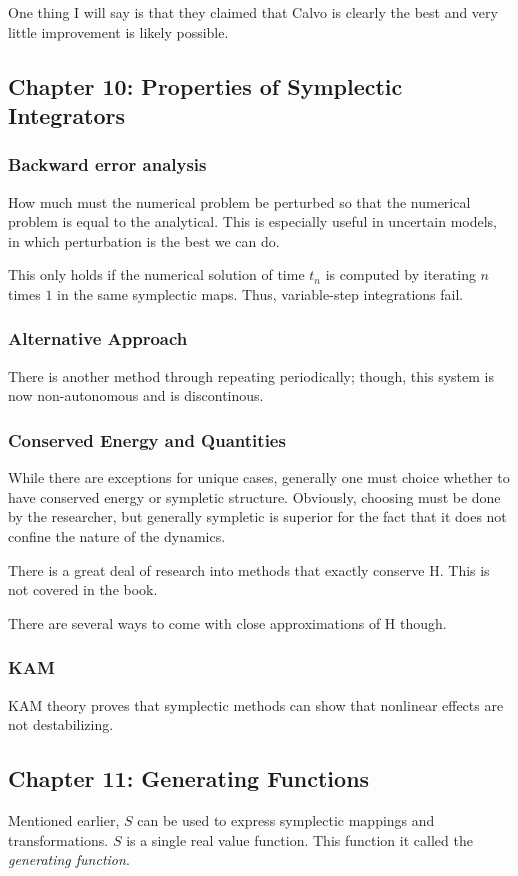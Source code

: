 One thing I will say is that they claimed that Calvo is clearly the best and very little improvement is likely possible.

\subsection{Chapter 10: Properties of Symplectic Integrators}
\subsubsection{Backward error analysis}
How much must the numerical problem be perturbed so that the numerical problem is equal to the analytical.
This is especially useful in uncertain models, in which perturbation is the best we can do.

This only holds if the numerical solution of time $t_n$ is computed by iterating $n$ times $1$ in the same symplectic maps. Thus, variable-step integrations fail.

\subsubsection{Alternative Approach}
There is another method through repeating periodically; though, this system is now non-autonomous and is discontinous.

\subsubsection{Conserved Energy and Quantities}
While there are exceptions for unique cases, generally one must choice whether to have conserved energy or sympletic structure. Obviously, choosing must
be done by the researcher, but generally sympletic is superior for the fact that it does not confine the nature of the dynamics.

There is a great deal of research into methods that exactly conserve H. This is not covered in the book.

There are several ways to come with close approximations of H though.

\subsubsection{KAM}
KAM theory proves that symplectic methods can show that nonlinear effects are not destabilizing.

\subsection{Chapter 11: Generating Functions}
Mentioned earlier, $S$ can be used to express symplectic mappings and transformations. $S$ is a single real value function. This function it called
the \emph{generating function}.

